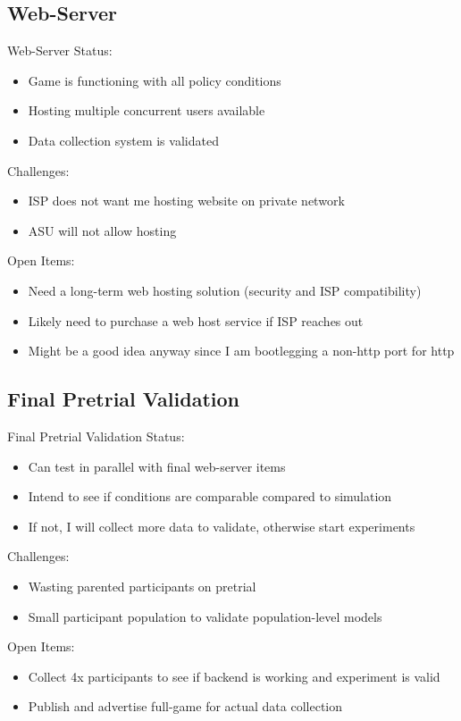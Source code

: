 \documentclass[aspectratio=1610, xcolor=dvipsnames]{packages/beamer}
\begin{document}
\subsection{Web-Server}
\begin{frame}{Web-Server}
    Status: \begin{itemize}
        \item Game is functioning with all policy conditions
        \item Hosting multiple concurrent users available
        \item Data collection system is validated
    \end{itemize}
    Challenges: \begin{itemize}
        \item ISP does not want me hosting website on private network
        \item ASU will not allow hosting
    \end{itemize}
    Open Items: \begin{itemize}
        \item Need a long-term web hosting solution (security and ISP compatibility)
        \item Likely need to purchase a web host service if ISP reaches out
        \item Might be a good idea anyway since I am bootlegging a non-http port for http
    \end{itemize}
\end{frame}

\subsection{Final Pretrial Validation}
\begin{frame}{Final Pretrial Validation}
    Status:
    \begin{itemize}
        \item Can test in parallel with final web-server items
        \item Intend to see if conditions are comparable compared to simulation
        \item If not, I will collect more data to validate, otherwise start experiments
    \end{itemize}
    Challenges:
    \begin{itemize}
        \item Wasting parented participants on pretrial
        \item Small participant population to validate population-level models
    \end{itemize}
    Open Items:
    \begin{itemize}
        \item Collect 4x participants to see if backend is working and experiment is valid
        \item Publish and advertise full-game for actual data collection
    \end{itemize}
\end{frame}
\end{document}

